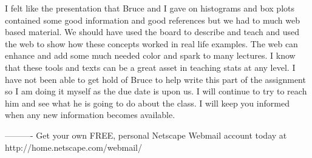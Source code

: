 I felt like the presentation that Bruce and I gave on histograms and box plots contained some good information and good references but we had to much web based material.
We should have used the board to describe and teach and used the web to show how these concepts worked in real life examples. The web can enhance and add some much needed color and spark to many lectures. I know that these tools and texts can be a great asset in teaching stats at any level.  
     I have not been able to get hold of Bruce to help write this part of the assignment so I am doing it myself as the due date is upon us. I will continue to try to reach him and see what he is going to do about the class. I will keep you informed when any new information becomes available.  
 

----------
Get your own FREE, personal Netscape Webmail account today at http://home.netscape.com/webmail/
